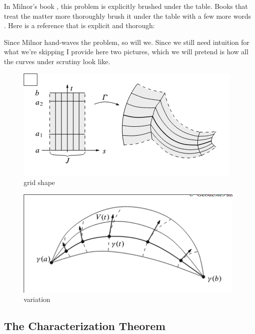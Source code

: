 \documentclass{article}
\begin{document}
In Milnor's book \cite{milnor}, this problem is explicitly brushed under the table.
Books that treat the matter more thoroughly brush it under the table with a few more words
\cite{salamon}.
Here is a reference that is explicit and thorough: \cite{lee}

Since Milnor hand-waves the problem, so will we. Since we still need intuition for what we're
skipping I provide here two pictures, which we will pretend is how all the curves under scrutiny
look like.

\begin{figure}
    \includegraphics{img/grid.png}
    \caption{grid shape}
    \label{fig:boat1}
\end{figure}
\begin{figure}
    \includegraphics{img/sail.png}
    \caption{variation}
    \label{fig:boat1}
\end{figure}


\subsection{The Characterization Theorem}
\end{document}
